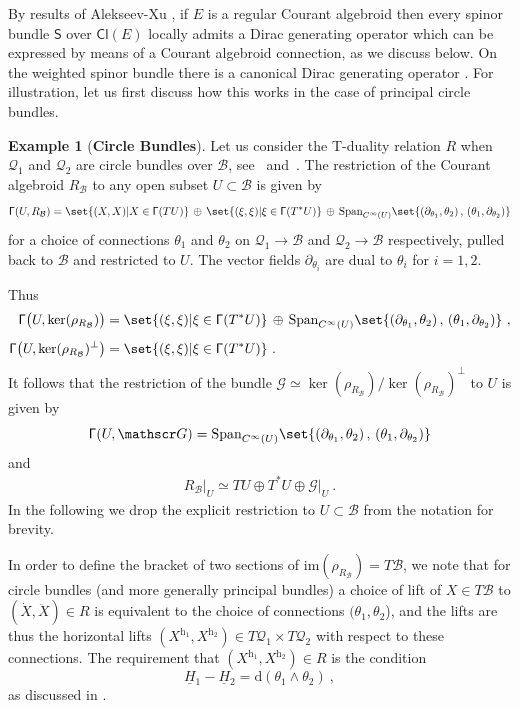 \documentclass[a4paper, reqno, 11pt]{amsart}
\numberwithin{equation}{section}
\theoremstyle{definition}
\newtheorem{example}[equation]{Example}
\newcommand{\red}[1]{\underline{#1}}
\newcommand{\de}{\mathrm{d}}
\renewcommand{\Im}{\ensuremath{\mathrm{im}}}
\newcommand{\Cl}{\mathsf{Cl}}
\newcommand{\cB}{{\mathcal B}}
\newcommand{\cQ}{{\mathcal Q}}
\newcommand{\ccG}{{\mathscr G}}
\newcommand{\sfS}{{\mathsf{S}}}
\newcommand{\sfGamma}{{\mathsf{\Gamma}}}
\theoremstyle{remark}
\begin{document}
By results of Alekseev-Xu \cite[Theorem 4.1]{Alekseev2001}, if $E$ is a regular Courant algebroid then every spinor bundle $\sfS$ over $\Cl(E)$  locally admits a Dirac generating operator which can be expressed by means of a Courant algebroid connection, as we discuss below. On the weighted spinor bundle there is a canonical Dirac generating operator \cite[Theorem 52]{Cortes:2019roa}. For illustration, let us first discuss how this works in the case of principal circle bundles.

\begin{example}[\textbf{Circle Bundles}]\label{ex:DGOcircle}
Let us consider the T-duality relation $R$ when $\cQ_1$ and $\cQ_2$ are circle bundles over $\cB$, see~\cite[Section~6]{DeFraja:2023fhe} and~\cite[Example~2.42]{deFraja2025Ricci}. The restriction of the Courant algebroid $R_\cB$ to any open subset $U \subset \cB$ is given by
\begin{align}
    \sfGamma(U,R_\cB) = \set{(X,X)  |  X\in \sfGamma(TU)} \, \oplus \, \set{
    (\xi,\xi)  |  \xi\in \sfGamma(T^*U)} \, \oplus \, \text{Span}_{C^\infty(U)}\set{(\partial_{\theta_1} , \theta_2) \,,\, (\theta_1, \partial_{\theta_2})}
\end{align}
for a choice of connections $\theta_1$ and $\theta_2$ on $\cQ_1\to \cB$ and $\cQ_2 \to \cB$ respectively, pulled back to $\cB$ and restricted to $U$. The vector fields $\partial_{\theta_i}$ are dual to $\theta_i$ for $i=1,2.$

Thus 
\begin{align}
    \sfGamma\big(U,\ker (\rho_{R_\cB})\big) & = \set{(\xi,\xi)  |  \xi\in \sfGamma(T^*U)} \, \oplus \, \text{Span}_{C^\infty(U)}\set{(\partial_{\theta_1}, \theta_2) \,,\,(\theta_1, \partial_{\theta_2})} \ ,\\[4pt]
    \sfGamma\big(U,\ker (\rho_{R_\cB} )^\perp  \big) & = \set{(\xi, \xi)  |  \xi\in \sfGamma(T^*U)} \ .
\end{align}
It follows that the restriction of the bundle $\ccG\simeq\ker(\rho_{R_\cB})/\ker(\rho_{R_\cB})^\perp$ to $U$ is given by $$\sfGamma(U,\ccG) = \text{Span}_{C^\infty(U)}\set{(\partial_{\theta_1}, \theta_2) \,,\,(\theta_1, \partial_{\theta_2})}$$ and 
\begin{align}
    R_\cB \big\rvert_U \simeq TU \oplus T^*U \oplus \ccG \big\rvert_U \ .
\end{align}
In the following we drop the explicit restriction to $U\subset\cB$ from the notation for brevity.

In order to define the bracket of two sections of $\Im(\rho_{R_\cB}) = T\cB$, we note that for circle bundles (and more generally principal bundles) a choice of lift of $X \in T\cB$ to $(\dot X, \ddot X) \in R$ is equivalent to the choice of connections $(\theta_1, \theta_2$), and the lifts are thus  the horizontal lifts $(X^{\mathrm{h}_1}, X^{\mathrm{h}_2})\in T\cQ_1\times T\cQ_2$ with respect to these connections. The requirement that $(X^{\mathrm{h}_1}, X^{\mathrm{h}_2}) \in R$ is the condition $$\red H{}_1- \red H{}_2 = \de (\theta_1 \wedge \theta_2) \ , $$ as discussed in \cite{cavalcanti2011generalized}. 


\end{example}
\end{document}
